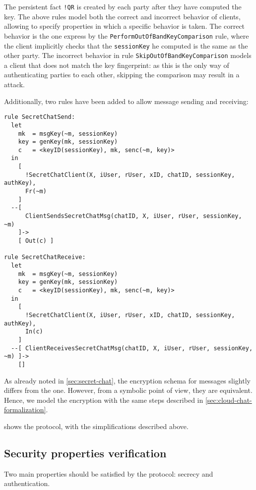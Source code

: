 The persistent fact \lstinline{!QR} is created by each party after they have computed the \schat{} key. The above rules model both the correct and incorrect behavior of clients, allowing to specify properties in which a specific behavior is taken. The correct behavior is the one express by the \lstinline{PerformOutOfBandKeyComparison} rule, where the client implicitly checks that the \lstinline{sessionKey} he computed is the same as the other party. The incorrect behavior in rule \lstinline{SkipOutOfBandKeyComparison} models a client that does not match the key fingerprint: as this is the only way of authenticating parties to each other, skipping the comparison may result in a \DiHe{} \mitm{} attack.

Additionally, two rules have been added to allow message sending and receiving:
\newpage
\begin{lstlisting}
rule SecretChatSend:
  let
    mk  = msgKey(~m, sessionKey)
    key = genKey(mk, sessionKey)
    c   = <keyID(sessionKey), mk, senc(~m, key)>
  in
    [ 
      !SecretChatClient(X, iUser, rUser, xID, chatID, sessionKey, authKey),
      Fr(~m)
    ]
  --[
      ClientSendsSecretChatMsg(chatID, X, iUser, rUser, sessionKey, ~m)
    ]->
    [ Out(c) ]

rule SecretChatReceive:
  let
    mk  = msgKey(~m, sessionKey)
    key = genKey(mk, sessionKey)
    c   = <keyID(sessionKey), mk, senc(~m, key)>
  in
    [
      !SecretChatClient(X, iUser, rUser, xID, chatID, sessionKey, authKey),
      In(c)
    ]
  --[ ClientReceivesSecretChatMsg(chatID, X, iUser, rUser, sessionKey, ~m) ]->
    []
\end{lstlisting}

As already noted in \cref{sec:secret-chat}, the encryption schema for \schat{} messages slightly differs from the \cchat{} one. However, from a symbolic point of view, they are equivalent. Hence, we model the \schat{} encryption with the same steps described in \cref{sec:cloud-chat-formalization}.

 shows the \schat{} protocol, with the simplifications described above.

\subsection{Security properties verification}

Two main properties should be satisfied by the \schat{} protocol: secrecy and authentication.


